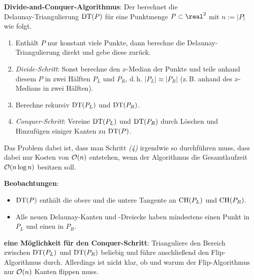 \textbf{Divide-and-Conquer-Algorithmus}:
Der  berechnet die\\
Delaunay-Triangulierung $\operatorname{DT}(P)$ für eine Punktmenge $P \subset \real^2$ mit $n := |P|$ wie folgt.
\begin{enumerate}
    \item
    Enthält $P$ nur konstant viele Punkte, dann berechne die Delaunay-Triangulierung direkt
    und gebe diese zurück.
    
    \item
    \emph{Divide-Schritt}:
    Sonst berechne den $x$-Median der Punkte und
    teile anhand diesem $P$ in zwei Hälften $P_L$ und $P_R$,
    d.\,h. $|P_L| \approx |P_R|$
    (z.\,B. anhand des $x$-Medians in zwei Hälften).
    
    \item
    Berechne rekursiv $\operatorname{DT}(P_L)$ und $\operatorname{DT}(P_R)$.
    
    \item
    \emph{Conquer-Schritt}:
    Vereine $\operatorname{DT}(P_L)$ und $\operatorname{DT}(P_R)$ durch Löschen und Hinzufügen einiger Kanten
    zu $\operatorname{DT}(P)$.
\end{enumerate}

Das Problem dabei ist, dass man Schritt \emph{(4)} irgendwie so durchführen muss,
dass dabei nur Kosten von $\mathcal{O}(n)$ entstehen, wenn der Algorithmus die
Gesamtlaufzeit $\mathcal{O}(n \log n)$ besitzen soll.

\linie

\textbf{Beobachtungen}:
\begin{itemize}
    \item
    $\operatorname{DT}(P)$ enthält die obere und die untere Tangente an $\operatorname{CH}(P_L)$ und $\operatorname{CH}(P_R)$.
    
    \item
    Alle neuen Delaunay-Kanten und -Dreiecke haben mindestens einen Punkt in $P_L$ und
    einen in $P_R$.
\end{itemize}

\textbf{eine Möglichkeit für den Conquer-Schritt}:
Trianguliere den Bereich zwischen $\operatorname{DT}(P_L)$ und $\operatorname{DT}(P_R)$ beliebig
und führe anschließend den Flip-Algorithmus durch.
Allerdings ist nicht klar, ob und warum der Flip-Algorithmus nur $\mathcal{O}(n)$ Kanten flippen muss.

\linie

